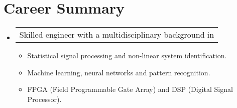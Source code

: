 \section{Career Summary}

\begin{itemize}[leftmargin=0.15in, label={}] %
    \item   \begin{tabular*}{0.2\textwidth}{l} Skilled engineer with a multidisciplinary background in \end{tabular*}\vspace{-7pt} %
            \begin{itemize} %
                \item{Statistical signal processing and non-linear system identification. \vspace{-2pt}} %
                \item{Machine learning, neural networks and pattern recognition. \vspace{-2pt}} %
                \item{FPGA (Field Programmable Gate Array) and DSP (Digital Signal Processor). \vspace{-2pt}} %
            \end{itemize}\vspace{-5pt}
\end{itemize} %